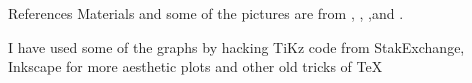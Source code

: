 \documentclass{beamer}
\begin{document}
\begin{frame}{References}
	Materials and some of the pictures are from \citep{James2015}, \citep{genuer}, \citep{cartbook},and \citep{geron2}.
	\printbibliography 	
	
	I have used some of the graphs by hacking TiKz code from StakExchange, Inkscape for more aesthetic plots and other old tricks of \TeX
	
\end{frame}
\end{document}
